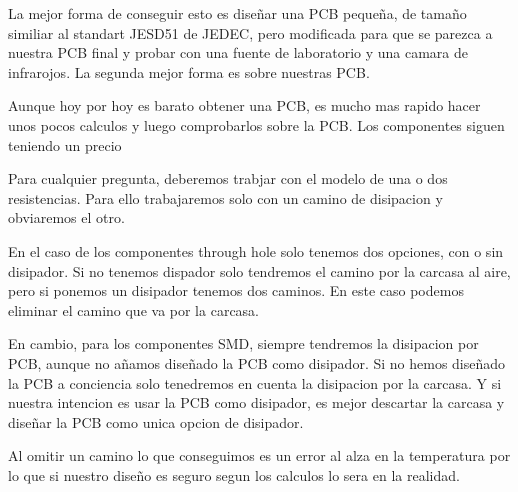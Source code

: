 La mejor forma de conseguir esto es diseñar una PCB pequeña, de tamaño similiar
al standart JESD51 de JEDEC, pero modificada para que se parezca a nuestra PCB
final y probar con una fuente de laboratorio y una camara de infrarojos. La segunda
mejor forma es sobre nuestras PCB.

Aunque hoy por hoy es barato obtener una PCB, es mucho mas rapido hacer unos pocos
calculos y luego comprobarlos sobre la PCB. Los componentes siguen teniendo un precio

Para cualquier pregunta, deberemos trabjar con el modelo de una o dos resistencias.
Para ello trabajaremos solo con un camino de disipacion y obviaremos el otro.

En el caso de los componentes through hole solo tenemos dos opciones, con o sin
disipador. Si no tenemos dispador solo tendremos el camino por la carcasa al
aire, pero si ponemos un disipador tenemos  dos caminos. En este caso podemos
eliminar el camino que va por la carcasa.

En cambio, para los componentes SMD, siempre tendremos la disipacion por PCB,
aunque no añamos diseñado la PCB como disipador. Si no hemos diseñado la PCB
a conciencia solo
tenedremos en cuenta la disipacion por la carcasa. Y si nuestra intencion es
usar la PCB como disipador, es mejor descartar la carcasa y diseñar la PCB
como unica opcion de disipador.

Al omitir un camino lo que conseguimos es un error al alza en la temperatura
por lo que si nuestro diseño es seguro
segun los calculos lo sera en la realidad.

